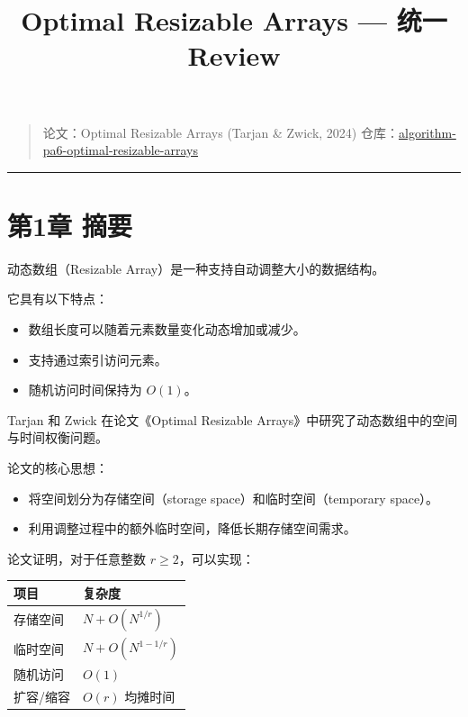 \documentclass[
  UTF8,
  a4paper,
  12pt]{ctexart}
\title{Optimal Resizable Arrays --- 统一 Review}
\author{}
\date{}
\newcounter{none} %
\providecommand{\tightlist}{%
  \setlength{\itemsep}{0pt}\setlength{\parskip}{0pt}}
\begin{document}
\maketitle

\begin{quote}
论文：Optimal Resizable Arrays (Tarjan \& Zwick, 2024)
仓库：\href{https://github.com/01w-01/algorithm-pa6-optimal-resizable-arrays}{algorithm-pa6-optimal-resizable-arrays}
\end{quote}

\begin{center}\rule{0.5\linewidth}{0.5pt}\end{center}

\section{第1章 摘要}\label{ux7b2c1ux7ae0-ux6458ux8981}

动态数组（Resizable Array）是一种支持自动调整大小的数据结构。

它具有以下特点：

\begin{itemize}
\tightlist
\item
  数组长度可以随着元素数量变化动态增加或减少。
\item
  支持通过索引访问元素。
\item
  随机访问时间保持为 \(O(1)\)。
\end{itemize}

Tarjan 和 Zwick 在论文《Optimal Resizable
Arrays》中研究了动态数组中的空间与时间权衡问题。

论文的核心思想：

\begin{itemize}
\tightlist
\item
  将空间划分为存储空间（storage space）和临时空间（temporary space）。
\item
  利用调整过程中的额外临时空间，降低长期存储空间需求。
\end{itemize}

论文证明，对于任意整数 \(r \geq 2\)，可以实现：

{\def\LTcaptype{none} %
\begin{longtable}[]{@{}ll@{}}
\toprule\noalign{}
项目 & 复杂度 \\
\midrule\noalign{}
\endhead
\bottomrule\noalign{}
\endlastfoot
存储空间 & \(N + O(N^{1/r})\) \\
临时空间 & \(N + O(N^{1-1/r})\) \\
随机访问 & \(O(1)\) \\
扩容/缩容 & \(O(r)\) 均摊时间 \\
\end{longtable}
}
\end{document}
